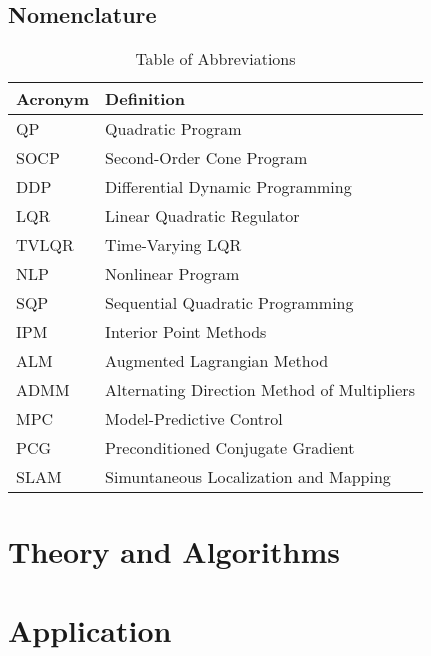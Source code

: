 \documentclass[10pt,oneside]{book}
\begin{document}
    \chapter*{Nomenclature}
    \begin{table}[h]
    \centering
    \begin{tabular}{l l}
            Acronym & Definition \\
            \midrule
            QP   & Quadratic Program \\
            SOCP & Second-Order Cone Program \\
            DDP  & Differential Dynamic Programming \\
            LQR  & Linear Quadratic Regulator \\
            TVLQR & Time-Varying LQR \\
            NLP  & Nonlinear Program \\
            SQP  & Sequential Quadratic Programming \\
            IPM  & Interior Point Methods \\
            ALM  & Augmented Lagrangian Method \\
            ADMM & Alternating Direction Method of Multipliers \\
            MPC  & Model-Predictive Control \\
            PCG  & Preconditioned Conjugate Gradient \\
            SLAM & Simuntaneous Localization and Mapping \\
    \end{tabular}
    \caption{Table of Abbreviations}
    \label{tab:abbreviations}
    \end{table}
    

    \mainmatter
    \pagestyle{fancy}
    

    

    \part{Theory and Algorithms} \label{part:theory}
    
    

    
    

    

    \part{Application} \label{part:application}
    
    
    

    \appendix
    

    \printbibliography
    
\end{document}
